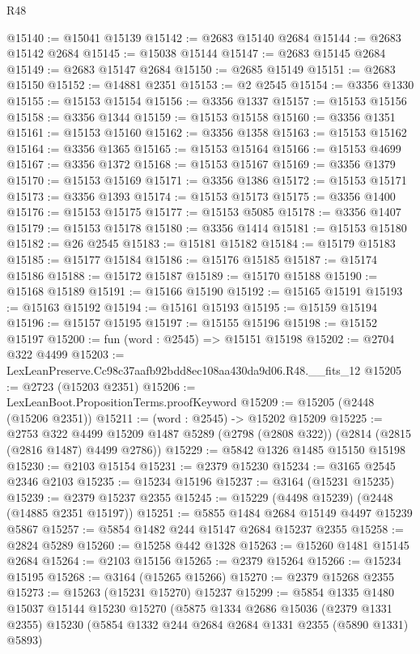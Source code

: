 \begin{lexlean}{R48}
\begin{coremodule}
@15140 := @15041 @15139
@15142 := @2683 @15140 @2684
@15144 := @2683 @15142 @2684
@15145 := @15038 @15144
@15147 := @2683 @15145 @2684
@15149 := @2683 @15147 @2684
@15150 := @2685 @15149
@15151 := @2683 @15150
@15152 := @14881 @2351
@15153 := @2 @2545
@15154 := @3356 @1330
@15155 := @15153 @15154
@15156 := @3356 @1337
@15157 := @15153 @15156
@15158 := @3356 @1344
@15159 := @15153 @15158
@15160 := @3356 @1351
@15161 := @15153 @15160
@15162 := @3356 @1358
@15163 := @15153 @15162
@15164 := @3356 @1365
@15165 := @15153 @15164
@15166 := @15153 @4699
@15167 := @3356 @1372
@15168 := @15153 @15167
@15169 := @3356 @1379
@15170 := @15153 @15169
@15171 := @3356 @1386
@15172 := @15153 @15171
@15173 := @3356 @1393
@15174 := @15153 @15173
@15175 := @3356 @1400
@15176 := @15153 @15175
@15177 := @15153 @5085
@15178 := @3356 @1407
@15179 := @15153 @15178
@15180 := @3356 @1414
@15181 := @15153 @15180
@15182 := @26 @2545
@15183 := @15181 @15182
@15184 := @15179 @15183
@15185 := @15177 @15184
@15186 := @15176 @15185
@15187 := @15174 @15186
@15188 := @15172 @15187
@15189 := @15170 @15188
@15190 := @15168 @15189
@15191 := @15166 @15190
@15192 := @15165 @15191
@15193 := @15163 @15192
@15194 := @15161 @15193
@15195 := @15159 @15194
@15196 := @15157 @15195
@15197 := @15155 @15196
@15198 := @15152 @15197
@15200 := fun (word : @2545) => @15151 @15198
@15202 := @2704 @322 @4499
@15203 := LexLeanPreserve.Cc98c37aafb92bdd8ec108aa430da9d06.R48.__fits_12
@15205 := @2723 (@15203 @2351)
@15206 := LexLeanBoot.PropositionTerms.proofKeyword
@15209 := @15205 (@2448 (@15206 @2351))
@15211 := (word : @2545) -> @15202 @15209
@15225 := @2753
    @322
    @4499
    @15209
    @1487
    @5289
    (@2798 (@2808 @322))
    (@2814 (@2815 (@2816 @1487) @4499 @2786))
@15229 := @5842 @1326 @1485 @15150 @15198
@15230 := @2103 @15154
@15231 := @2379 @15230
@15234 := @3165 @2545 @2346 @2103
@15235 := @15234 @15196
@15237 := @3164 (@15231 @15235)
@15239 := @2379 @15237 @2355
@15245 := @15229 (@4498 @15239) (@2448 (@14885 @2351 @15197))
@15251 := @5855 @1484 @2684 @15149 @4497 @15239 @5867
@15257 := @5854 @1482 @244 @15147 @2684 @15237 @2355
@15258 := @2824 @5289
@15260 := @15258 @442 @1328
@15263 := @15260 @1481 @15145 @2684
@15264 := @2103 @15156
@15265 := @2379 @15264
@15266 := @15234 @15195
@15268 := @3164 (@15265 @15266)
@15270 := @2379 @15268 @2355
@15273 := @15263 (@15231 @15270) @15237
@15299 := @5854
    @1335
    @1480
    @15037
    @15144
    @15230
    @15270
    (@5875
      @1334
      @2686
      @15036
      (@2379 @1331 @2355)
      @15230
      (@5854 @1332 @244 @2684 @2684 @1331 @2355 (@5890 @1331) @5893)

\end{coremodule}
\end{lexlean}
